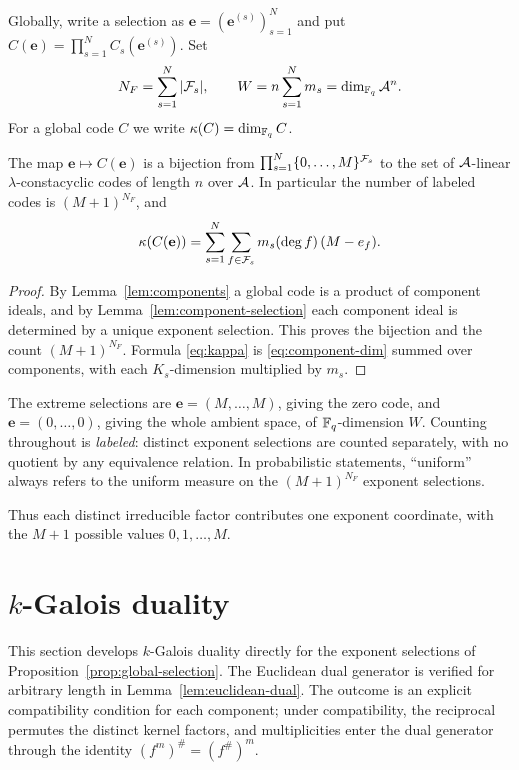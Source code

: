 Globally, write a selection as
$\mathbf{e}=(\mathbf{e}^{(s)})_{s=1}^{N}$ and put
$C(\mathbf{e})=\prod_{s=1}^{N}C_s(\mathbf{e}^{(s)})$.  Set
\[
N_F=\sum_{s=1}^{N}|\mathcal F_s|,
\qquad
W=n\sum_{s=1}^{N}m_s=\dim_{\mathbb F_q}\mathcal A^n .
\]
For a global code $C$ we write $\kappa(C)=\dim_{\mathbb F_q}C$.

\begin{proposition}\label{prop:global-selection}
The map $\mathbf{e}\mapsto C(\mathbf{e})$ is a bijection from
$\prod_{s=1}^{N}\{0,\ldots,M\}^{\mathcal F_s}$ to the set of $\mathcal A$-linear
$\lambda$-constacyclic codes of length $n$ over $\mathcal A$.  In particular the number
of labeled codes is $(M+1)^{N_F}$, and
\begin{equation}\label{eq:kappa}
\kappa(C(\mathbf{e}))
   =\sum_{s=1}^{N}\sum_{f\in\mathcal F_s}m_s(\deg f)\,(M-e_f).
\end{equation}
\end{proposition}

\begin{proof}
By Lemma~\ref{lem:components} a global code is a product of component ideals,
and by Lemma~\ref{lem:component-selection} each component ideal is determined
by a unique exponent selection.  This proves the bijection and the count
$(M+1)^{N_F}$.  Formula \eqref{eq:kappa} is \eqref{eq:component-dim} summed
over components, with each $K_s$-dimension multiplied by $m_s$.
\end{proof}

The extreme selections are $\mathbf{e}=(M,\ldots,M)$, giving the zero code, and
$\mathbf{e}=(0,\ldots,0)$, giving the whole ambient space, of $\mathbb F_q$-dimension
$W$.  Counting throughout is \emph{labeled}: distinct exponent selections are
counted separately, with no quotient by any equivalence relation.  In
probabilistic statements, ``uniform'' always refers to the uniform measure on
the $(M+1)^{N_F}$ exponent selections.

Thus each distinct irreducible factor contributes one exponent coordinate,
with the $M+1$ possible values $0,1,\ldots,M$.

\section{\texorpdfstring{$k$}{k}-Galois duality}\label{sec:duality}

This section develops $k$-Galois duality directly for the exponent
selections of Proposition~\ref{prop:global-selection}.  The Euclidean dual
generator is verified for arbitrary length in
Lemma~\ref{lem:euclidean-dual}.  The outcome is an explicit compatibility
condition for each component; under compatibility, the reciprocal permutes
the distinct kernel factors, and multiplicities enter the dual generator
through the identity $(f^m)^{\#}=(f^{\#})^m$.

